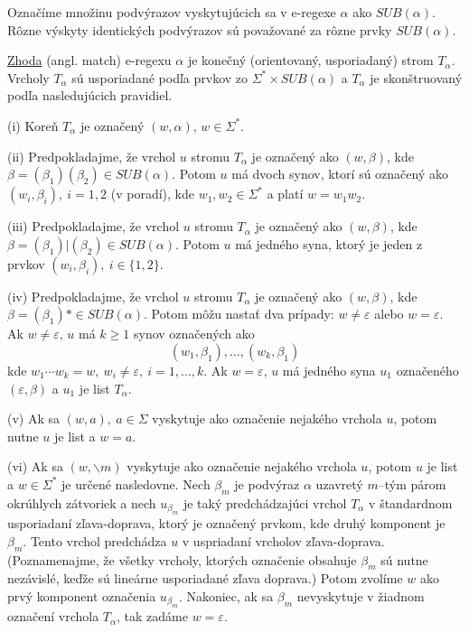 Označíme množinu podvýrazov vyskytujúcich sa v e-regexe $\alpha$ ako $SUB(\alpha )$. Rôzne výskyty identických podvýrazov sú považované za rôzne prvky $SUB(\alpha )$.

\begin{df}
\underline{Zhoda} (angl. match) e-regexu $\alpha$ je konečný (orientovaný, us\-po\-ria\-da\-ný) strom $T_\alpha$. Vrcholy $T_\alpha$ sú usporiadané podľa prvkov zo $\Sigma^* \times SUB(\alpha)$ a $T_\alpha$ je skonštruovaný podľa nasledujúcich pravidiel.
\begin{list}{}{}
\item[(i)] Koreň $T_\alpha$ je označený $(w,\alpha )$, $w \in \Sigma^*$.
\item[(ii)] Predpokladajme, že vrchol $u$ stromu $T_\alpha$ je označený ako $(w,\beta )$, kde $\beta = (\beta_1)(\beta_2) \in SUB(\alpha)$. Potom $u$ má dvoch synov, ktorí sú označený ako $(w_i,\beta_i),~i=1,2$ (v poradí), kde $w_1,w_2 \in \Sigma^*$ a platí $w = w_1w_2$.
\item[(iii)] Predpokladajme, že vrchol $u$ stromu $T_\alpha$ je označený ako $(w,\beta )$, kde $\beta = (\beta_1)|(\beta_2) \in SUB(\alpha)$. Potom $u$ má jedného syna, ktorý je jeden z prvkov $(w_i,\beta_i), ~ i \in \lbrace 1,2 \rbrace$.
\item[(iv)] Predpokladajme, že vrchol $u$ stromu $T_\alpha$ je označený ako $(w,\beta )$, kde $\beta = (\beta_1)* \in SUB(\alpha)$. Potom môžu nastať dva prípady: $w \neq \varepsilon$ alebo $w = \varepsilon$. Ak $w \neq \varepsilon$, $u$ má $k \geq 1$ synov označených ako
$$ (w_1,\beta_1), \ldots, (w_k,\beta_1) $$
kde $w_1 \cdots w_k = w, ~ w_i \neq \varepsilon, ~ i=1, \ldots ,k$. Ak $w = \varepsilon$, $u$ má jedného syna $u_1$ označeného $(\varepsilon , \beta )$ a $u_1$ je list $T_\alpha$.
\item[(v)] Ak sa $(w,a), ~ a\in \Sigma$ vyskytuje ako označenie nejakého vrchola $u$, potom nutne $u$ je list a $w=a$.
\item[(vi)] Ak sa $(w,\backslash m)$ vyskytuje ako označenie nejakého vrchola $u$, potom $u$ je list a $w \in \Sigma^*$ je určené nasledovne. Nech $\beta_m$ je podvýraz $\alpha$ uzavretý $m$--tým párom okrúhlych zátvoriek a nech $u_{\beta_m}$ je taký predchádzajúci vrchol $T_\alpha$ v štandardnom usporiadaní zľava-doprava, ktorý je označený prvkom, kde druhý komponent je $\beta_m $. Tento vrchol predchádza $u$ v uspriadaní vrcholov zľava-doprava. (Poznamenajme, že všetky vrcholy, ktorých označenie obsahuje $\beta_m$ sú nutne nezávislé, keďže sú lineárne usporiadané zľava doprava.) Potom zvolíme $w$ ako prvý komponent označenia $u_{\beta_m}$. Nakoniec, ak sa $\beta_m$ nevyskytuje v žiadnom označení vrchola $T_\alpha$, tak zadáme $w = \varepsilon$.
\end{list}
\end{df}

